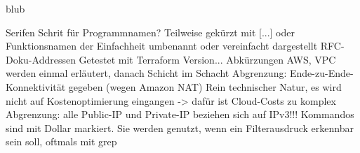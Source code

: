 blub

\ifFalse
Serifen Schrit für Programmnamen?
Teilweise gekürzt mit [...] oder Funktionsnamen der Einfachheit umbenannt oder vereinfacht dargestellt
RFC-Doku-Addressen
Getestet mit Terraform Version...
Abkürzungen AWS, VPC werden einmal erläutert, danach Schicht im Schacht
Abgrenzung: Ende-zu-Ende-Konnektivität gegeben (wegen Amazon NAT)
Rein technischer Natur, es wird nicht auf Kostenoptimierung eingangen -> dafür ist Cloud-Costs zu komplex
Abgrenzung: alle Public-IP und Private-IP beziehen sich auf IPv3!!!
Kommandos sind mit Dollar markiert. Sie werden genutzt, wenn ein Filterausdruck erkennbar sein soll, oftmals mit grep
\fi